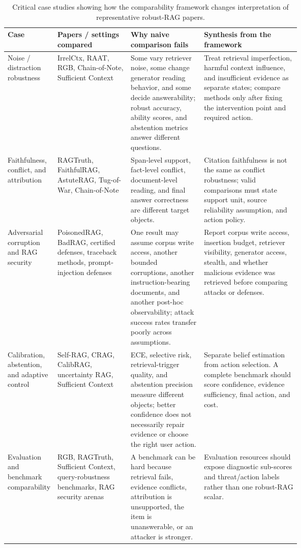 \begin{table}[t]
\centering
\scriptsize
\renewcommand{\arraystretch}{0.9}
\begin{tabularx}{\linewidth}{>{\raggedright\arraybackslash}p{0.17\linewidth}>{\raggedright\arraybackslash}p{0.25\linewidth}>{\raggedright\arraybackslash}p{0.25\linewidth}X}
\toprule
\textbf{Case} & \textbf{Papers / settings compared} & \textbf{Why naive comparison fails} & \textbf{Synthesis from the framework} \\
\midrule
Noise / distraction robustness & IrrelCtx, RAAT, RGB, Chain-of-Note, Sufficient Context & Some vary retriever noise, some change generator reading behavior, and some decide answerability; robust accuracy, ability scores, and abstention metrics answer different questions. & Treat retrieval imperfection, harmful context influence, and insufficient evidence as separate states; compare methods only after fixing the intervention point and required action. \\
Faithfulness, conflict, and attribution & RAGTruth, FaithfulRAG, AstuteRAG, Tug-of-War, Chain-of-Note & Span-level support, fact-level conflict, document-level reading, and final answer correctness are different target objects. & Citation faithfulness is not the same as conflict robustness; valid comparisons must state support unit, source reliability assumption, and action policy. \\
Adversarial corruption and RAG security & PoisonedRAG, BadRAG, certified defenses, traceback methods, prompt-injection defenses & One result may assume corpus write access, another bounded corruptions, another instruction-bearing documents, and another post-hoc observability; attack success rates transfer poorly across assumptions. & Report corpus write access, insertion budget, retriever visibility, generator access, stealth, and whether malicious evidence was retrieved before comparing attacks or defenses. \\
Calibration, abstention, and adaptive control & Self-RAG, CRAG, CalibRAG, uncertainty RAG, Sufficient Context & ECE, selective risk, retrieval-trigger quality, and abstention precision measure different objects; better confidence does not necessarily repair evidence or choose the right user action. & Separate belief estimation from action selection. A complete benchmark should score confidence, evidence sufficiency, final action, and cost. \\
Evaluation and benchmark comparability & RGB, RAGTruth, Sufficient Context, query-robustness benchmarks, RAG security arenas & A benchmark can be hard because retrieval fails, evidence conflicts, attribution is unsupported, the item is unanswerable, or an attacker is stronger. & Evaluation resources should expose diagnostic sub-scores and threat/action labels rather than one robust-RAG scalar. \\
\bottomrule
\end{tabularx}
\caption{Critical case studies showing how the comparability framework changes interpretation of representative robust-RAG papers.}
\label{tab:critical-case-studies}
\end{table}
